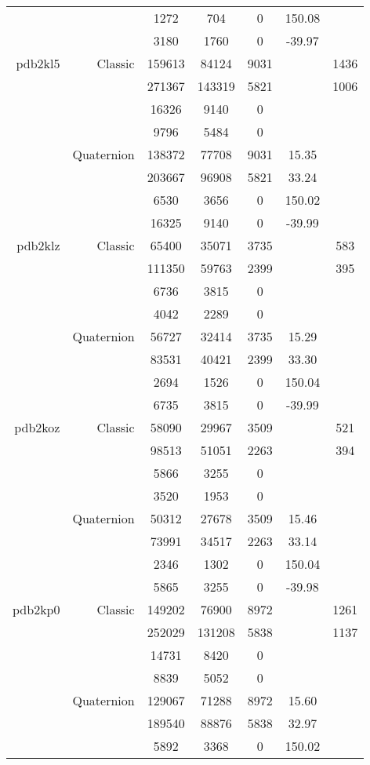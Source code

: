\begin{xltabular}{\textwidth}{r|rcccSc}
& & 1272 & 704 & 0 & 150.08 & \\
& & 3180 & 1760 & 0 & -39.97 & \\ \addlinespace
pdb2kl5 & Classic & 159613 & 84124 & 9031 & & 1436 \\
& & 271367 & 143319 & 5821 & & 1006 \\
& & 16326 & 9140 & 0 & & \\
& & 9796 & 5484 & 0 & & \\
& Quaternion & 138372 & 77708 & 9031 & 15.35 & \\
& & 203667 & 96908 & 5821 & 33.24 & \\
& & 6530 & 3656 & 0 & 150.02 & \\
& & 16325 & 9140 & 0 & -39.99 & \\ \addlinespace
pdb2klz & Classic & 65400 & 35071 & 3735 & & 583 \\
& & 111350 & 59763 & 2399 & & 395 \\
& & 6736 & 3815 & 0 & & \\
& & 4042 & 2289 & 0 & & \\
& Quaternion & 56727 & 32414 & 3735 & 15.29 & \\
& & 83531 & 40421 & 2399 & 33.30 & \\
& & 2694 & 1526 & 0 & 150.04 & \\
& & 6735 & 3815 & 0 & -39.99 & \\ \addlinespace
pdb2koz & Classic & 58090 & 29967 & 3509 & & 521 \\
& & 98513 & 51051 & 2263 & & 394 \\
& & 5866 & 3255 & 0 & & \\
& & 3520 & 1953 & 0 & & \\
& Quaternion & 50312 & 27678 & 3509 & 15.46 & \\
& & 73991 & 34517 & 2263 & 33.14 & \\
& & 2346 & 1302 & 0 & 150.04 & \\
& & 5865 & 3255 & 0 & -39.98 & \\ \addlinespace
pdb2kp0 & Classic & 149202 & 76900 & 8972 & & 1261 \\
& & 252029 & 131208 & 5838 & & 1137 \\
& & 14731 & 8420 & 0 & & \\
& & 8839 & 5052 & 0 & & \\
& Quaternion & 129067 & 71288 & 8972 & 15.60 & \\
& & 189540 & 88876 & 5838 & 32.97 & \\
& & 5892 & 3368 & 0 & 150.02 & \\

\end{xltabular}
